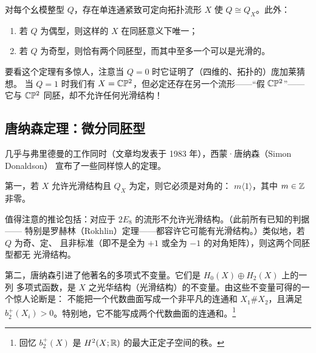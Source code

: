 \begin{theorem}[弗里德曼]
对每个幺模整型 $Q$，存在单连通紧致可定向拓扑流形 $X$ 使 $Q\cong Q_{X}$。此外：
\begin{enumerate}[label=(\arabic*), leftmargin=2em, itemsep=2pt]
\item 若 $Q$ 为偶型，则这样的 $X$ 在同胚意义下唯一；
\item 若 $Q$ 为奇型，则恰有两个同胚型，而其中至多一个可以是光滑的。
\end{enumerate}
\end{theorem}


要看这个定理有多惊人，注意当 $Q=0$ 时它证明了（四维的、拓扑的）庞加莱猜想。
当 $Q=1$ 时我们有 $X=\mathbb{C}\mathbb{P}^{2}$，但必定还存在另一个流形——“假 $\mathbb{C}\mathbb{P}^{2}$”——
它与 $\mathbb{C}\mathbb{P}^{2}$ 同胚，却不允许任何光滑结构！

\subsection{唐纳森定理：微分同胚型}

几乎与弗里德曼的工作同时（文章均发表于 1983 年），西蒙·唐纳森（Simon Donaldson）
宣布了一些同样惊人的定理。

第一，若 $X$ 允许光滑结构且 $Q_{X}$ 为定，则它必须是对角的：
$m\langle 1\rangle$，其中 $m\in\mathbb{Z}$ 非零。

值得注意的推论包括：对应于 $2E_{8}$ 的流形不允许光滑结构。（此前所有已知的判据——
特别是罗赫林（Rokhlin）定理——都容许它可能有光滑结构。）类似地，若 $Q$ 为奇、定、
且非标准（即不是全为 $+1$ 或全为 $-1$ 的对角矩阵），则这两个同胚型都无
光滑结构。


第二，唐纳森引进了他著名的多项式不变量。它们是 $H_{0}(X)\oplus H_{2}(X)$ 上的一列
多项式函数，是 $X$ 之光华结构（光滑结构）的不变量。由这些不变量可得的一个惊人论断是：
不能把一个代数曲面写成一个非平凡的连通和 $X_{1}\#X_{2}$，且满足
$b^{+}_{2}(X_{i})>0$。特别地，它不能写成两个代数曲面的连通和。\footnote{回忆
$b^{+}_{2}(X)$ 是 $H^{2}(X;\mathbb{R})$ 的最大正定子空间的秩。}

